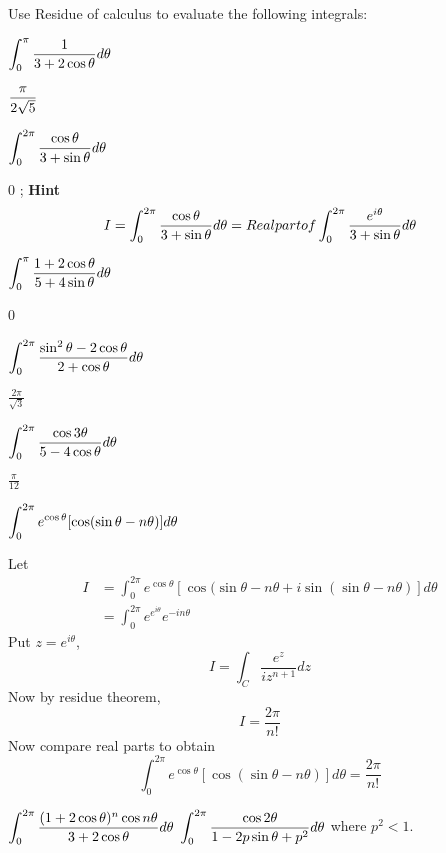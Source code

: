 \begin{problems}
\prob Use Residue of calculus to evaluate the following integrals:

	\subprob  $ \displaystyle \int_0^{\pi}{1 \over 3+2\cos\theta} d\theta $
		\begin{sol}
	$\displaystyle \frac{\pi}{2\sqrt{5}}$	
	\end{sol}
	\subprob  $ \displaystyle \int_0^{2\pi}{\cos \theta \over 3+\sin\theta} d\theta $
	\begin{sol}
	0 ; \textbf{Hint}
	\[I = \int_0^{2\pi}{\cos \theta \over 3+\sin\theta} d\theta = Real part of \int_0^{2\pi}{\frac{e^{i\theta}}{3+\sin\theta}} d\theta \]
	\end{sol}
	\subprob  $ \displaystyle \int_0^{\pi}{1+2\cos\theta \over 5+4\sin\theta} d\theta $
		\begin{sol}
	0 
	\end{sol}
	\subprob  $ \displaystyle \int_0^{2\pi}{\sin^2 \theta - 2 \cos\theta \over 2+\cos\theta} d\theta $
			\begin{sol}
	$\frac{2\pi}{\sqrt{3}}$
	\end{sol}

	\subprob  $ \displaystyle \int_0^{2\pi}{\cos 3\theta \over 5-4\cos\theta} d\theta $
	\begin{sol}
	$\frac{\pi}{12}$
	\end{sol}
	\subprob  $ \displaystyle \int_0^{2\pi} e^{\cos \theta}[\cos(\sin \theta - n \theta)]d\theta $
	\begin{sol}
	Let 
	\begin{align*}
	I &=\int_0^{2\pi} e^{\cos \theta}[\cos(\sin \theta - n \theta+ i\sin(\sin \theta - n \theta)]d\theta \\
		&= \int_0^{2\pi}e^{e^{i\theta}}e^{-in\theta} 
\end{align*}
	Put $z=e^{i\theta}$,
	\[I = \int_C \frac{e^z}{iz^{n+1}}dz\]
	Now by residue theorem,
	\[I = \frac{2\pi}{n!}\]
	Now compare real parts to obtain
	\[\int_0^{2\pi} e^{\cos \theta}[\cos(\sin \theta - n \theta)]d\theta = \frac{2\pi}{n!}\]
	
	\end{sol}

	
	{\subprob  $ \displaystyle \int_0^{2\pi}{(1+2\cos\theta)^n \cos n\theta \over 3+2\cos\theta} d\theta $}{	\subprob  $ \displaystyle \int_0^{2\pi}{\cos 2\theta \over 1-2p\sin\theta + p^2} d\theta $ where $p^2 < 1$.}
					
\end{problems}


